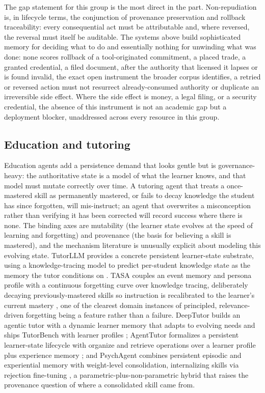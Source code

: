 The gap statement for this group is the most direct in the part. Non-repudiation is, in lifecycle terms, the conjunction of provenance preservation and rollback traceability: every consequential act must be attributable and, where reversed, the reversal must itself be auditable. The systems above build sophisticated memory for deciding what to do and essentially nothing for unwinding what was done: none scores rollback of a tool-originated commitment, a placed trade, a granted credential, a filed document, after the authority that licensed it lapses or is found invalid, the exact open instrument the broader corpus identifies, a retried or reversed action must not resurrect already-consumed authority or duplicate an irreversible side effect. Where the side effect is money, a legal filing, or a security credential, the absence of this instrument is not an academic gap but a deployment blocker, unaddressed across every resource in this group.

\subsection{Education and tutoring}

Education agents add a persistence demand that looks gentle but is governance-heavy: the authoritative state is a model of what the learner knows, and that model must mutate correctly over time. A tutoring agent that treats a once-mastered skill as permanently mastered, or fails to decay knowledge the student has since forgotten, will mis-instruct; an agent that overwrites a misconception rather than verifying it has been corrected will record success where there is none. The binding axes are mutability (the learner state evolves at the speed of learning and forgetting) and provenance (the basis for believing a skill is mastered), and the mechanism literature is unusually explicit about modeling this evolving state. TutorLLM provides a concrete persistent learner-state substrate, using a knowledge-tracing model to predict per-student knowledge state as the memory the tutor conditions on \citep{li2025tutorllm}. TASA couples an event memory and persona profile with a continuous forgetting curve over knowledge tracing, deliberately decaying previously-mastered skills so instruction is recalibrated to the learner's current mastery \citep{wu2025tasa}, one of the clearest domain instances of principled, relevance-driven forgetting being a feature rather than a failure. DeepTutor builds an agentic tutor with a dynamic learner memory that adapts to evolving needs and ships TutorBench with learner profiles \citep{zhao2026deeptutor}; AgentTutor formalizes a persistent learner-state lifecycle with organize and retrieve operations over a learner profile plus experience memory \citep{liu2026agenttutor}; and PsychAgent combines persistent episodic and experiential memory with weight-level consolidation, internalizing skills via rejection fine-tuning \citep{yang2026psychagent}, a parametric-plus-non-parametric hybrid that raises the provenance question of where a consolidated skill came from.

